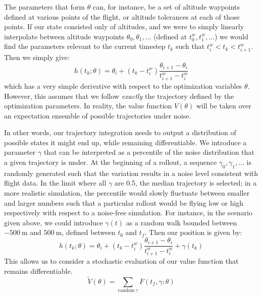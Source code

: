 \documentclass[11pt]{scrartcl} %
\begin{document}
The parameters that form $\theta$ can, for instance, be a set of altitude waypoints defined at various points of the flight, or altitude tolerances at each of those points. If our state consisted only of altitudes, and we were to simply linearly interpolate between altitude waypoints $\theta_0, \theta_1, \dots$ (defined at $t^w_0, t^w_1, \dots$) we would find the parameters relevant to the current timestep $t_k$ such that $t^w_i < t_k < t^w_{i+1}$. Then we simply give:
\[h(t_k; \theta) = \theta_i + (t_k - t_i^w) \frac{\theta_{i+1}-\theta_i}{t_{i+1}^w - t^w_i}\]
which has a very simple derivative with respect to the optimization variables $\theta$. However, this assumes that we follow \emph{exactly} the trajectory defined by the optimization parameters. In reality, the value function $V(\theta)$ will be taken over an expectation ensemble of possible trajectories under noise.

In other words, our trajectory integration needs to output a distribution of possible states it might end up, while remaining differentiable. We introduce a parameter $\gamma$ that can be interpreted as a percentile of the noise distribution that a given trajectory is under. At the beginning of a rollout, a sequence $\gamma_0, \gamma_1, \dots$ is randomly generated such that the variation results in a noise level consistent with flight data. In the limit where all $\gamma$ are 0.5, the median trajectory is selected; in a more realistic simulation, the percentile would slowly fluctuate between smaller and larger numbers such that a particular rollout would be flying low or high respectively with respect to a noise-free simulation. For instance, in the scenario given above, we could introduce $\gamma(t)$ as a random walk bounded between $-500~\textrm{m}$ and $500~\textrm{m}$, defined between $t_0$ and $t_f$. Then our position is given by:
\[h(t_k; \theta) = \theta_i + (t_k - t_i^w) \frac{\theta_{i+1}-\theta_i}{t_{i+1}^w - t^w_i} + \gamma(t_k)\]
This allows us to consider a stochastic evaluation of our value function that remains differentiable.
\[\tilde V(\theta)=\sum_{\textrm{random}~\gamma} F(t_f, \gamma; \theta)\]
\end{document}
